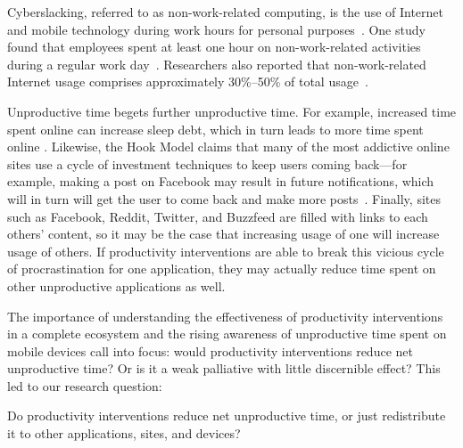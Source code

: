 
Cyberslacking, referred to as non-work-related computing, is the use of Internet and mobile technology during work hours for personal purposes~\cite{VITAK20111751,PEE2008120, Pamela2004, lim2002}. One study found that employees spent at least one hour on non-work-related activities during a regular work day~\cite{VITAK20111751}. Researchers also reported that non-work-related Internet usage comprises approximately 30\%--50\% of total usage~\cite{RESTUBOG2011247,JAMALUDDIN2015495}. %


Unproductive time begets further unproductive time. For example, increased time spent online can increase sleep debt, which in turn leads to more time spent online \cite{Mark:2016:SDS:2858036.2858437}. Likewise, the Hook Model claims that many of the most addictive online sites use a cycle of investment techniques to keep users coming back---for example, making a post on Facebook may result in future notifications, which will in turn will get the user to come back and make more posts~\cite{eyal2014hooked}. Finally, sites such as Facebook, Reddit, Twitter, and Buzzfeed are filled with links to each others' content, so it may be the case that increasing usage of one will increase usage of others. If productivity interventions are able to break this vicious cycle of procrastination for one application, they may actually reduce time spent on other unproductive applications as well.

The importance of understanding the effectiveness of productivity interventions in a complete ecosystem and the rising awareness of unproductive time spent on mobile devices call into focus: would productivity interventions reduce net unproductive time? Or is it a weak palliative with little discernible effect? This led to our research question:

\begin{resques}[RQ]
Do productivity interventions reduce net unproductive time, or just redistribute it to other applications, sites, and devices?
\end{resques}


